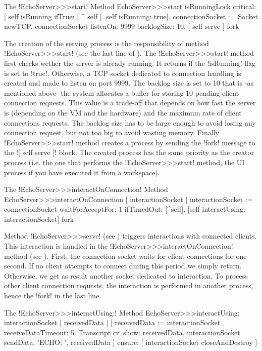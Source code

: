 \documentclass[a4paper,10pt,twoside]{book}
\begin{document}
\begin{method}{The \ct!EchoServer>>>start! Method}
EchoServer>>>start
	isRunningLock critical: [
		self isRunning ifTrue: [ ^ self ].
		self isRunning: true].
	connectionSocket := Socket newTCP.
	connectionSocket listenOn: 9999 backlogSize: 10.
	[ self serve ] fork
\end{method}

The creation of the serving process is the responsibility of method \ct!EchoServer>>>start! (see the last line of ).
The \ct!EchoServer>>>start! method first checks wether the server is already running.
It returns if the \ct!isRunning! flag is set to \ct!true!.
Otherwise, a TCP socket dedicated to connection handling is created and made to listen on port 9999.
The backlog size is set to 10 that is -as mentioned above- the system allocates a buffer for storing 10 pending client connection requests.
This value is a trade-off that depends on how fast the server is (depending on the VM and the hardware) and the maximum rate of client connections requests.
The backlog size has to be large enough to avoid losing any connection request, but not too big to avoid wasting memory.
Finally \ct!EchoServer>>>start! method creates a process by sending the \ct!fork! message to the \ct![ self serve ]! block.
The created process has the same priority as the creator process (i.e. the one that performs the \ct!EchoServer>>>start! method, the UI process if you have executed it from a workspace).


\begin{method}{The \ct!EchoServer>>>interactOnConnection! Method}
EchoServer>>>interactOnConnection
	| interactionSocket |
	interactionSocket := connectionSocket waitForAcceptFor: 1 ifTimedOut: [^self].
	[self interactUsing: interactionSocket] fork
\end{method}

Method \ct!EchoServer>>>serve! (see ) triggers interactions with connected clients.
This interaction is handled in the \ct!EchoServer>>>interactOnConnection! method (see ).
First, the connection socket waits for client connections for one second.
If no client attempts to connect during this period we simply return.
Otherwise, we get as result another socket dedicated to interaction.
To process other client connection requests, the interaction is performed in another process, hence the \ct!fork! in the last line.

\begin{method}{The \ct!EchoServer>>>interactUsing:! Method}
EchoServer>>>interactUsing: interactionSocket
	| receivedData |
	[ receivedData := interactionSocket receiveDataTimeout: 5.
	 Transcript cr; show: receivedData.
	 interactionSocket sendData: 'ECHO: ', receivedData
	] ensure: [
	 interactionSocket closeAndDestroy ]
\end{method}
\end{document}
